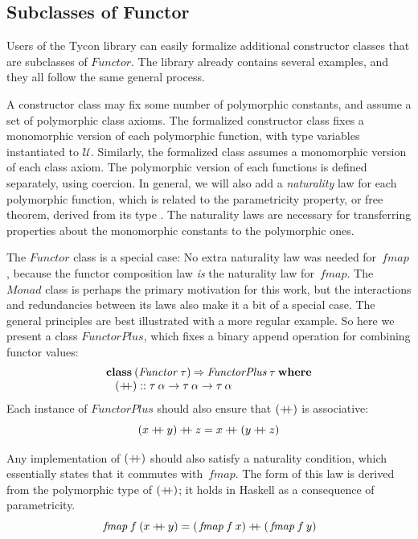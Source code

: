 \documentclass{sigplanconf}
\newcommand{\hsapp}{\mathbin{+\mkern-7mu+}}
\newcommand{\To}{\mathbin{\Rightarrow}}
\newcommand{\U}{\ensuremath{\mathcal{U}}}
\newcommand{\kwd}[1]{\mathbf{#1}}
\newcommand{\hsc}[1]{\ensuremath{\mathit{#1}}}
\newcommand{\fmap}{\,\hsc{fmap}} %
\newcommand{\tA}{\alpha}
\newcommand{\tT}{\tau}
\theoremstyle{definition}
\begin{document}
\subsection{Subclasses of Functor}
\label{sec:functorplus}

Users of the Tycon library can easily formalize additional constructor classes that are subclasses of \hsc{Functor}. The library already contains several examples, and they all follow the same general process.

A constructor class may fix some number of polymorphic constants, and assume a set of polymorphic class axioms. The formalized constructor class fixes a monomorphic version of each polymorphic function, with type variables instantiated to $\U$. Similarly, the formalized class assumes a monomorphic version of each class axiom. The polymorphic version of each functions is defined separately, using coercion. In general, we will also add a \emph{naturality} law for each polymorphic function, which is related to the parametricity property, or free theorem, derived from its type \cite{Wadler1989}. The naturality laws are necessary for transferring properties about the monomorphic constants to the polymorphic ones.

The \hsc{Functor} class is a special case: No extra naturality law was needed for $\fmap$, because the functor composition law \emph{is} the naturality law for $\fmap$. The \hsc{Monad} class is perhaps the primary motivation for this work, but the interactions and redundancies between its laws also make it a bit of a special case. The general principles are best illustrated with a more regular example. So here we present a class \hsc{FunctorPlus}, which fixes a binary append operation for combining functor values:
%
\begin{align*}
& \kwd{class}\:(\hsc{Functor}\:\tT) \To \hsc{FunctorPlus}\:\tT\:\kwd{where} \\[-\jot]
& \hspace{8pt} (\hsapp)::\tT\:\tA\to\tT\:\tA\to\tT\:\tA
\end{align*}
%
Each instance of \hsc{FunctorPlus} should also ensure that $(\hsapp)$ is associative:
%
\begin{equation}
\label{eq:append-assoc}
({x}\hsapp{y})\hsapp{z}={x}\hsapp({y}\hsapp{z})
\end{equation}

Any implementation of $(\hsapp)$ should also satisfy a naturality condition, which essentially states that it commutes with $\fmap$. The form of this law is derived from the polymorphic type of $(\hsapp)$; it holds in Haskell as a consequence of parametricity.
%
\begin{equation}
\label{eq:fmap-append}
\fmap\:f\:(x \hsapp y) = (\fmap\:f\:x) \hsapp (\fmap\:f\:y)
\end{equation}
\end{document}
